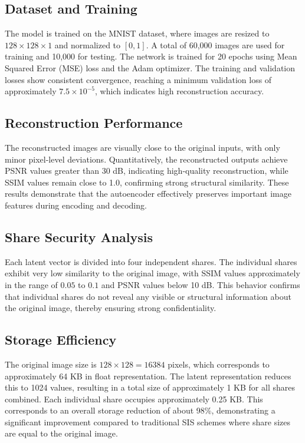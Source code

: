 \subsection{Dataset and Training}

The model is trained on the MNIST dataset, where images are resized to $128 \times 128 \times 1$ and normalized to $[0,1]$. A total of 60,000 images are used for training and 10,000 for testing. The network is trained for 20 epochs using Mean Squared Error (MSE) loss and the Adam optimizer. The training and validation losses show consistent convergence, reaching a minimum validation loss of approximately $7.5 \times 10^{-5}$, which indicates high reconstruction accuracy.

\subsection{Reconstruction Performance}

The reconstructed images are visually close to the original inputs, with only minor pixel-level deviations. Quantitatively, the reconstructed outputs achieve PSNR values greater than 30 dB, indicating high-quality reconstruction, while SSIM values remain close to 1.0, confirming strong structural similarity. These results demonstrate that the autoencoder effectively preserves important image features during encoding and decoding.

\subsection{Share Security Analysis}

Each latent vector is divided into four independent shares. The individual shares exhibit very low similarity to the original image, with SSIM values approximately in the range of $0.05$ to $0.1$ and PSNR values below 10 dB. This behavior confirms that individual shares do not reveal any visible or structural information about the original image, thereby ensuring strong confidentiality.

\subsection{Storage Efficiency}

The original image size is $128 \times 128 = 16384$ pixels, which corresponds to approximately 64 KB in float representation. The latent representation reduces this to 1024 values, resulting in a total size of approximately 1 KB for all shares combined. Each individual share occupies approximately 0.25 KB. This corresponds to an overall storage reduction of about 98\%, demonstrating a significant improvement compared to traditional SIS schemes where share sizes are equal to the original image.

